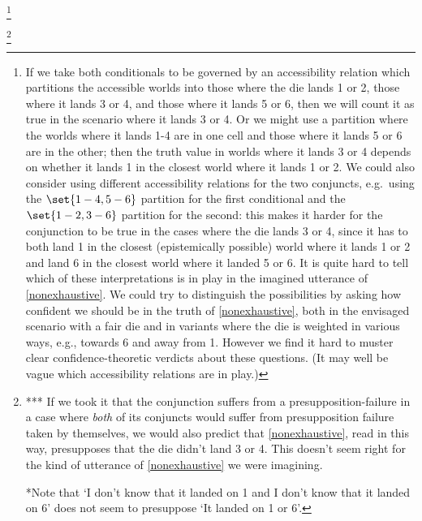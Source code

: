 \documentclass[If.tex]{subfiles}
\begin{document}
\footnote{If we take both conditionals to be governed by an accessibility relation which partitions the accessible worlds into those where the die lands 1 or 2, those where it lands 3 or 4, and those where it lands 5 or 6, then we will count it as true in the scenario where it lands 3 or 4.  Or we might use a partition where the worlds where it lands 1-4 are in one cell and those where it lands 5 or 6 are in the other; then the truth value in worlds where it lands 3 or 4 depends on whether it lands 1 in the closest world where it lands 1 or 2.  
	We could also consider using different accessibility relations for the two conjuncts, e.g.\ using the $\set{1-4,5-6}$ partition for the first conditional and the $\set{1-2,3-6}$ partition for the second: this makes it harder for the conjunction to be true in the cases where the die lands 3 or 4, since it has to both land 1 in the closest (epistemically possible) world where it lands 1 or 2 and land 6 in the closest world where it landed 5 or 6.  It is quite hard to tell which of these interpretations is in play in the imagined utterance of \ref{nonexhaustive}.  We could try to distinguish the possibilities by asking how confident we should be in the truth of \ref{nonexhaustive}, both in the envisaged scenario with a fair die and in variants where the die is weighted in various ways, e.g., towards 6 and away from 1.  However we find it hard to muster clear confidence-theoretic verdicts about these questions.  (It may well be vague which accessibility relations are in play.) }

%
\footnote{*** If we took it that the conjunction suffers from a presupposition-failure in a case where \emph{both} of its conjuncts would suffer from presupposition failure taken by themselves, we would also predict that \ref{nonexhaustive}, read in this way, presupposes that the die didn't land 3 or 4.  This doesn't seem right for the kind of utterance of \ref{nonexhaustive} we were imagining.  
	
	*Note that ‘I don't know that it landed on 1 and I don't know that it landed on 6’ does not seem to presuppose ‘It landed on 1 or 6’.
	}
\end{document}
